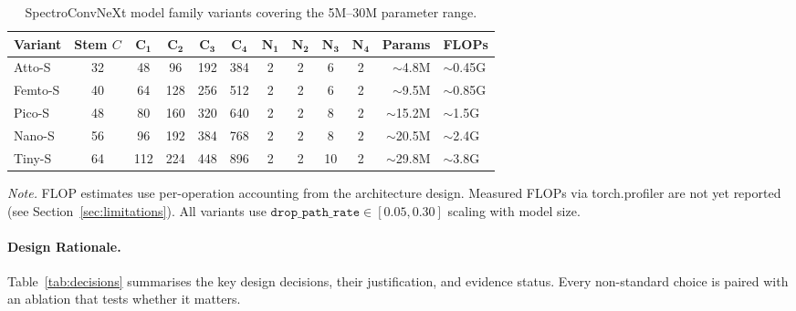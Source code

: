 \documentclass{article}
\begin{document}
\begin{table}[h]
  \centering
  \caption{SpectroConvNeXt model family variants covering the 5M--30M
  parameter range.}
  \label{tab:variants}
  \small
  \begin{tabular}{lcccccccccr}
  \toprule
  \textbf{Variant} & \textbf{Stem $C$} & $\mathbf{C_1}$ & $\mathbf{C_2}$ & $\mathbf{C_3}$ & $\mathbf{C_4}$ &
  $\mathbf{N_1}$ & $\mathbf{N_2}$ & $\mathbf{N_3}$ & $\mathbf{N_4}$ &
  \textbf{Params} & \textbf{FLOPs} \\
  \midrule
  Atto-S  & 32 & 48  & 96  & 192 & 384  & 2 & 2 &  6 & 2 & $\sim$4.8M  & $\sim$0.45G \\
  Femto-S & 40 & 64  & 128 & 256 & 512  & 2 & 2 &  6 & 2 & $\sim$9.5M  & $\sim$0.85G \\
  Pico-S  & 48 & 80  & 160 & 320 & 640  & 2 & 2 &  8 & 2 & $\sim$15.2M & $\sim$1.5G  \\
  Nano-S  & 56 & 96  & 192 & 384 & 768  & 2 & 2 &  8 & 2 & $\sim$20.5M & $\sim$2.4G  \\
  Tiny-S  & 64 & 112 & 224 & 448 & 896  & 2 & 2 & 10 & 2 & $\sim$29.8M & $\sim$3.8G  \\
  \bottomrule
  \end{tabular}

  \vspace{4pt}
  \emph{Note.} FLOP estimates use per-operation accounting from the architecture
  design. Measured FLOPs via torch.profiler are not yet reported
  (see Section~\ref{sec:limitations}). All variants use
  $\texttt{drop\_path\_rate} \in [0.05, 0.30]$ scaling with model size.
\end{table}

\paragraph{Design Rationale.}
Table~\ref{tab:decisions} summarises the key design decisions, their
justification, and evidence status. Every non-standard choice is paired with an
ablation that tests whether it matters.
\end{document}
